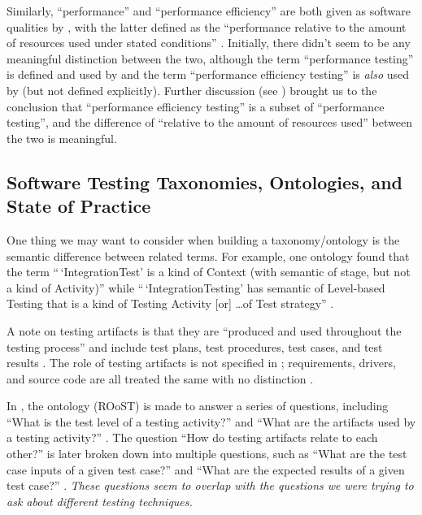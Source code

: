 Similarly, ``performance'' and ``performance efficiency'' are
both given as software qualities by \citeauthor{IEEE2017}, with the latter
defined as the ``performance relative to the amount
of resources used under stated conditions'' \citeyearpar[p.~319]{IEEE2017}.
Initially, there didn't seem to be any meaningful distinction
between the two, although the term ``performance testing'' is defined
\citeyearpar[p.~320]{IEEE2017} and used by \citeauthor{IEEE2017} and
the term ``performance efficiency testing'' is \emph{also} used by
\citeauthor{IEEE2017} (but not defined explicitly). Further discussion (see
) brought us to the conclusion that ``performance
efficiency testing'' is a subset of ``performance testing'', and the
difference of ``relative to the amount of resources used'' between the two
is meaningful.

\subsection{Software Testing Taxonomies, Ontologies, and State of Practice}

One thing we may want to consider when building a taxonomy/ontology is the
semantic difference between related terms. For example, one ontology found
that the term ``\,`IntegrationTest' is a kind of Context (with
semantic of stage, but not a kind of Activity)'' while ``\,`IntegrationTesting'
has semantic of Level-based Testing that is a kind of Testing Activity [or]
\dots of Test strategy'' \citep[p.~157]{TebesEtAl2019}.

A note on testing artifacts is that they are ``produced and used throughout
the testing process'' and include test plans, test procedures, test cases, and
test results \citep[p.~3]{SouzaEtAl2017}. The role of testing
artifacts is not specified in \citep{BarbosaEtAl2006};
requirements, drivers, and source code are all treated the same
with no distinction \citep[p.~3]{BarbosaEtAl2006}.

In \citep{SouzaEtAl2017}, the ontology (ROoST)  is made to
answer a series of questions, including ``What is the test level of a testing
activity?'' and ``What are the artifacts used by a testing activity?''
\citep[pp.~8-9]{SouzaEtAl2017}. 
The question ``How do testing artifacts relate to each other?''
\citep[p.~8]{SouzaEtAl2017} is later broken down into multiple questions,
such as ``What are the test case inputs of a given test case?'' and ``What are
the expected results of a given test case?'' \citep[p.~21]{SouzaEtAl2017}.
\emph{These questions seem to overlap with the questions we were trying to ask
      about different testing techniques.}

